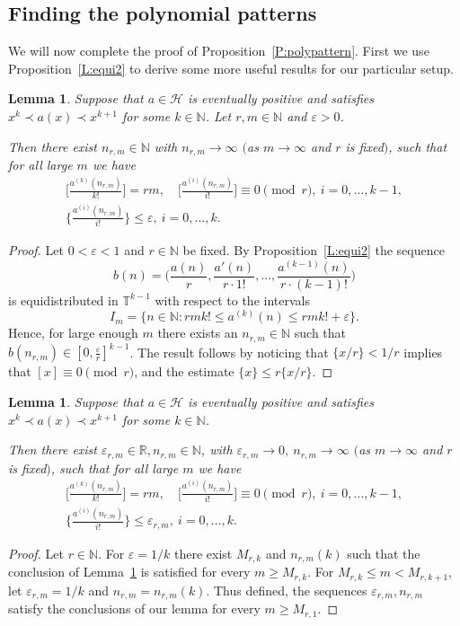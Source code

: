\documentclass[11pt]{amsart}
\renewcommand{\H}{\mathcal{H}}
\newcommand{\T}{\mathbb{T}}
\newcommand{\R}{\mathbb{R}}
\newcommand{\N}{\mathbb{N}}
\theoremstyle{plain}
\newtheorem{lemma}[theorem]{Lemma}
\theoremstyle{definition}
\theoremstyle{remark}
\begin{document}
\subsection{Finding the polynomial patterns}
We will now complete the proof of Proposition~\ref{P:polypattern}.
First we use Proposition~\ref{L:equi2} to derive some more useful results for our particular setup.
\begin{lemma} \label{L:medium2} Suppose that $a\in \H$ is eventually
  positive and satisfies $x^k \prec a(x)\prec x^{k+1}$ for some $k\in
  \N$. Let   $r,m\in\N$ and $\varepsilon>0$.

  Then  there exist
  $n_{r,m}\in\N$ with $n_{r,m}\to\infty$ $($as $m\to\infty$ and $r$ is
  fixed$)$, such that  for all large $m$ we have
  \begin{gather*}
    \Big[\frac{a^{(k)}(n_{r,m})}{k!}\Big]=rm, \quad
    \Big[\frac{a^{(i)}(n_{r,m})}{i!}\Big]\equiv 0 \!\!\pmod{r},\
    i=0,\ldots,k-1, \\ \Big\{\frac{a^{(i)}(n_{r,m})}{i!}\Big\}\leq
    \varepsilon, \ i=0,\ldots,k.
  \end{gather*}
\end{lemma}
\begin{proof}
  Let $0<\varepsilon<1$ and $r\in \N$ be fixed. By Proposition~\ref{L:equi2} the sequence
$$
b(n)=\Big(\frac{a(n)}{r},\frac{a'(n)}{r\cdot1!},\ldots,\frac{a^{(k-1)}(n)}{r\cdot
  (k-1)!}\Big)
$$ is equidistributed in $\T^{k-1}$
with respect to the intervals
$$
I_m=\{n\in\N\colon rmk!\leq a^{(k)}(n)\leq rmk!+\varepsilon\}.
$$
Hence, for large enough $m$ there exists an $n_{r,m}\in\N$ such that
$b(n_{r,m})\in [0,\frac{\varepsilon}{r}]^{k-1}$. The result follows
by noticing that $\{x/r\}<1/r$ implies that $[x]\equiv 0
\!\!\pmod{r}$, and the estimate $\{x\}\leq r\{x/r\}$.
\end{proof}

\begin{lemma} \label{L:strong2}Suppose that $a\in \H$ is eventually
  positive and satisfies $x^k \prec a(x)\prec x^{k+1}$ for some $k\in
  \N$.

   Then there exist $\varepsilon_{r,m}\in\R,n_{r,m}\in\N$, with
  $\varepsilon_{r,m}\to 0,\ n_{r,m}\to\infty$ $($as $m\to\infty$ and
  $r$ is fixed$)$, such that for all large $m$ we have
  \begin{gather*}
    \Big[\frac{a^{(k)}(n_{r,m})}{k!}\Big]=rm, \quad
    \Big[\frac{a^{(i)}(n_{r,m})}{i!}\Big]\equiv 0 \!\!\pmod{r},\
    i=0,\ldots,k-1, \\ \Big\{\frac{a^{(i)}(n_{r,m})}{i!}\Big\}\leq
    \varepsilon_{r,m}, \ i=0,\ldots,k.
  \end{gather*}
\end{lemma}
\begin{proof}
  Let $r\in\N$. For $\varepsilon=1/k$ there exist $M_{r,k}$ and
  $n_{r,m}(k)$ such that the conclusion of Lemma~\ref{L:medium2} is
  satisfied for every $m\geq M_{r,k}$.  For $M_{r,k}\leq m< M_{r,k+1}$,
  let $\varepsilon_{r,m}=1/k$ and $n_{r,m}=n_{r,m}(k)$. Thus defined,
  the sequences $\varepsilon_{r,m}, n_{r,m}$  satisfy the conclusions of
  our lemma for every $m\geq M_{r,1}$.
\end{proof}
\end{document}
